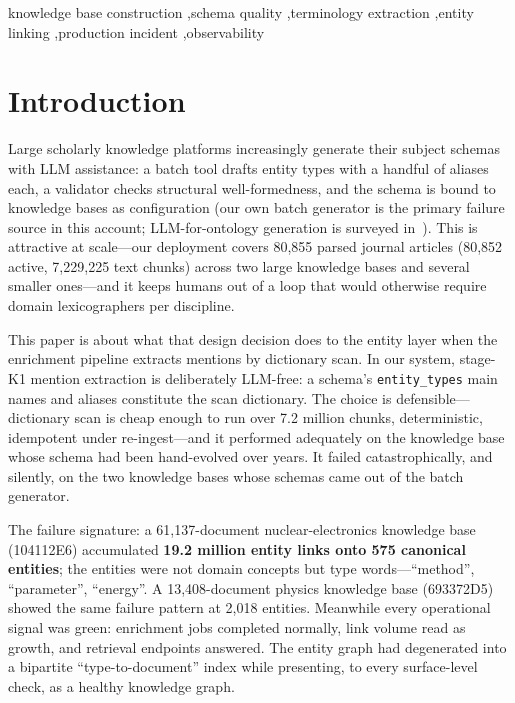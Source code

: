 \documentclass[preprint,12pt]{elsarticle}
\begin{document}
\begin{frontmatter}
\begin{keyword}
knowledge base construction \sep schema quality \sep terminology
extraction \sep entity linking \sep production incident \sep observability
\end{keyword}
\end{frontmatter}

\section{Introduction}
\label{sec:intro}

Large scholarly knowledge platforms increasingly generate their subject
schemas with LLM assistance: a batch tool drafts entity types with a handful
of aliases each, a validator checks structural well-formedness, and the
schema is bound to knowledge bases as configuration (our own batch generator
is the primary failure source in this account; LLM-for-ontology generation is surveyed
in~\cite{llmonto}). This is attractive at scale---our deployment covers
80{,}855 parsed journal articles (80{,}852 active, 7{,}229{,}225 text
chunks) across two large knowledge bases and several smaller ones---and it
keeps humans out of a loop that would otherwise require domain
lexicographers per discipline.

This paper is about what that design decision does to the entity layer when
the enrichment pipeline extracts mentions by dictionary scan. In our system,
stage-K1 mention extraction is deliberately LLM-free: a schema's
\texttt{entity\_types} main names and aliases constitute the scan
dictionary. The choice is defensible---dictionary scan is cheap enough to
run over 7.2 million chunks, deterministic, idempotent under re-ingest---and
it performed adequately on the knowledge base whose schema had been
hand-evolved over years. It failed catastrophically, and silently, on the
two knowledge bases whose schemas came out of the batch generator.

The failure signature: a 61{,}137-document nuclear-electronics knowledge
base (104112E6) accumulated \textbf{19.2 million entity links onto 575
canonical entities}; the entities were not domain concepts but type
words---``method'', ``parameter'', ``energy''. A 13{,}408-document physics
knowledge base (693372D5) showed the same failure pattern at 2{,}018 entities.
Meanwhile every operational signal was green: enrichment jobs completed
normally, link volume read as growth, and retrieval endpoints answered. The
entity graph had degenerated into a bipartite ``type-to-document'' index
while presenting, to every surface-level check, as a healthy knowledge
graph.
\end{document}
